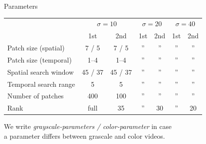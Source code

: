 \documentclass[mathserif, 8pt]{beamer}
\begin{document}
\begin{frame}{Parameters}
	\begin{center}

	\begin{tabular}{l | c c | c c | c c }
		& \multicolumn{2}{c|}{$\sigma = 10$} 
		& \multicolumn{2}{c|}{$\sigma = 20$} 
		& \multicolumn{2}{c}{$\sigma = 40$} \\
		                            & 1st    & 2nd   & 1st   & 2nd   & 1st   & 2nd    \\\hline\hline
		Patch size (spatial)        &  7 / 5 & 7 / 5 & ''  & ''  & ''  &  ''  \\
		Patch size (temporal)       &  1--4  & 1--4  & ''  & ''  & ''  &  ''  \\
		Spatial search window       & 45 / 37&45 / 37& ''  & ''  & ''  &  ''  \\
		Temporal search range       & 5      & 5     & ''  & ''  & ''  &  ''  \\
		Number of patches           & 400    & 100   & ''  & ''  & ''  &  ''  \\
		Rank                        & full   & 35    & ''  & 30    & ''  & 20     \\
	\end{tabular}

	\bigskip

	We write \emph{grayscale-parameters / color-parameter} in case\\ a parameter
	differs between grascale and color videos.

	\end{center}
\end{frame}
\end{document}
